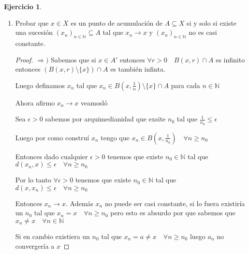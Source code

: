 \documentclass[12pt]{report}
\newcommand{\N}{\mathbb{N}}
\newcommand{\Ra}{\Rightarrow}
\newcommand{\ra}{\rightarrow}
\theoremstyle{definition}
\newtheorem*{remark}{Observación}
\newtheorem{ej}{Ejercicio}
\begin{document}
\begin{ej}
\begin{enumerate}
\begin{enumerate}
\begin{proof}
\begin{remark}
\begin{proof}
			Luego $x \in A'$
		\end{proof}
	\end{remark}

	  \end{proof}
      \end{enumerate}
    \item Probar que $x \in X$ es un punto de acumulación de $A \subseteq X$ si y solo si existe una sucesión $(x_{n})_{n \in \N} \subseteq A$ tal que $x_{n} \ra x$ y $(x_{n})_{n \in \N}$ no es casi constante. 
      \begin{proof}
    $\Ra )$ Sabemos que si $x \in A'$ entonces $\forall r>0 \quad B(x,r) \cap A$ es infinito entonces $(B(x,r)\setminus \{x\}) \cap A$ es también infinta. 

      Luego definamos $x_{n}$ tal que $x_{n} \in B(x,\frac{1}{n}) \setminus \{x\} \cap A$ para cada $n \in \N$

Ahora afirmo $x_{n} \ra x$ veamosló

Sea $\epsilon > 0$ sabemos por arquimedianidad que exsite $n_0$ tal que $\frac{1}{n_0} \leq \epsilon$

Luego por como construí $x_n$ tengo que $x_n \in B(x,\frac{1}{n_0}) \quad \forall n \geq n_0$

Entonces dado cualquier $\epsilon > 0$ tenemos que existe $n_0 \in \N$ tal que $d(x_n ,x ) \leq \epsilon \quad \forall n \geq n_0$

Por lo tanto $ \forall \epsilon > 0$ tenemos que existe $n_0 \in \N$ tal que $ d(x,x_n) \leq \epsilon \quad \forall n \geq n_0 $ 

Entonces $x_n \ra x$. Además $x_{n}$ no puede ser casi constante, si lo fuera existiría un $n_{0}$ tal que  $x_{n} = x \quad \forall n \geq n_{0}$ pero esto es absurdo por que sabemos que $x_n \neq x \quad \forall n \in \N$  
     
Si en cambio existiera un $n_0$ tal que $x_n = a \neq x \quad \forall n \geq n_0$ luego $a_n$ no convergería a $x$

    \end{proof}
  \end{enumerate}
\end{ej}
\end{document}
